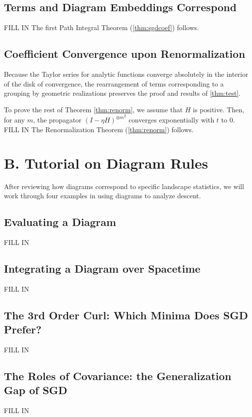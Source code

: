 \documentclass{article}
\begin{document}
    \subsection*{Terms and Diagram Embeddings Correspond}
        {\color{moor} FILL IN}
        The first Path Integral Theorem (\ref{thm:sgdcoef}) follows.

    \subsection*{Coefficient Convergence upon Renormalization}
        Because the Taylor series for analytic functions converge absolutely
        in the interior of the disk of convergence, the rearrangement of terms
        corresponding to a grouping by geometric realizations preserves the
        proof and results of \ref{thm:test}.  

        To prove the rest of Theorem \ref{thm:renorm}, we assume that $H$ is
        positive.  Then, for any $m$, the propagator ${(I-\eta H)^{\otimes
        m}}^t$ converges exponentially with $t$ to $0$.
        {\color{moor} FILL IN}
        The Renormalization Theorem (\ref{thm:renorm}) follows.

\section*{B. Tutorial on Diagram Rules}
    After reviewing how diagrams correspond to specific landscape statistics,
    we will work through four examples in using diagrams to analyze descent.

    \subsection*{Evaluating a Diagram}
        {\color{moor} FILL IN}
    \subsection*{Integrating a Diagram over Spacetime}
        {\color{moor} FILL IN}
    \subsection*{The 3rd Order Curl: Which Minima Does SGD Prefer?}
        {\color{moor} FILL IN}
    \subsection*{The Roles of Covariance: the Generalization Gap of SGD}
        {\color{moor} FILL IN}
        
\end{document}
